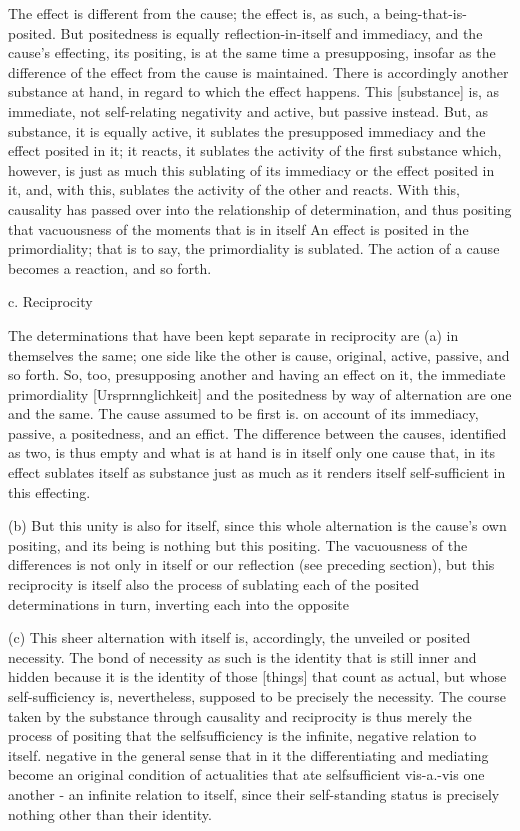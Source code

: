 {The effect is different from the cause;
the effect is, as such, a being-that-is-posited.
But positedness is equally reflection-in-itself and immediacy, and
the cause's effecting, its positing, is at the same time a presupposing,
insofar as the difference of the effect from the cause is maintained.
There is accordingly another substance at hand,
in regard to which the effect happens.
This [substance] is, as immediate,
not self-relating negativity and active, but passive instead.
But, as substance, it is equally active,
it sublates the presupposed immediacy and the effect posited in it;
it reacts, it sublates the activity of the first substance which, however, is
just as much this sublating of its immediacy or
the effect posited in it, and, with this,
sublates the activity of the other and reacts.
With this, causality has passed over into the relationship of determination,
and thus positing that vacuousness of the moments that is in itself
An effect is posited in the primordiality;
that is to say, the primordiality is sublated.
The action of a cause becomes a reaction, and so forth.

c. Reciprocity

The determinations that have been kept separate in reciprocity are (a) in
themselves the same; one side like the other is cause, original, active, passive,
and so forth. So, too, presupposing another and having an effect on it, the
immediate primordiality [Ursprnnglichkeit] and the positedness by way of
alternation are one and the same. The cause assumed to be first is. on
account of its immediacy, passive, a positedness, and an effict. The difference
between the causes, identified as two, is thus empty and what is at hand is
in itself only one cause that, in its effect sublates itself as substance just as
much as it renders itself self-sufficient in this effecting.

(b) But this unity is also for itself, since this whole alternation is the cause's
own positing, and its being is nothing but this positing. The vacuousness
of the differences is not only in itself or our reflection (see
preceding section), but this reciprocity is itself also the process of sublating
each of the posited determinations in turn, inverting each into the opposite

(c) This sheer alternation with itself is, accordingly, the unveiled or posited
necessity. The bond of necessity as such is the identity that is still inner and
hidden because it is the identity of those [things] that count as actual, but
whose self-sufficiency is, nevertheless, supposed to be precisely the necessity.
The course taken by the substance through causality and reciprocity is thus
merely the process of positing that the selfsufficiency is the infinite, negative
relation to itself. negative in the general sense that in it the differentiating and
mediating become an original condition of actualities that ate selfsufficient
vis-a.-vis one another - an infinite relation to itself, since their self-standing
status is precisely nothing other than their identity.

}
